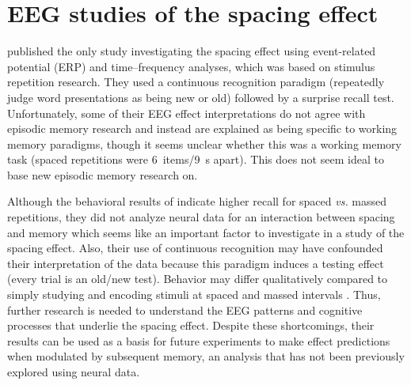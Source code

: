 
\section{EEG studies of the spacing effect}

 published the only study investigating the spacing effect using event-related potential (ERP) and time--frequency analyses, which was based on stimulus repetition research.  They used a continuous recognition paradigm (repeatedly judge word presentations as being new or old) followed by a surprise recall test.
Unfortunately, some of their EEG effect interpretations do not agree with episodic memory research and instead are explained as being specific to working memory paradigms, though it seems unclear whether this was a working memory task (spaced repetitions were 6~items/9~s apart).  This does not seem ideal to base new episodic memory research on.


Although the behavioral results of  indicate higher recall for spaced \textit{vs.} massed repetitions, they did not analyze neural data for an interaction between spacing and memory which seems like an important factor to investigate in a study of the spacing effect.  Also, their use of continuous recognition may have confounded their interpretation of the data because this paradigm induces a testing effect (every trial is an old/new test).  Behavior may differ qualitatively compared to simply studying and encoding stimuli at spaced and massed intervals \cite[p.~91]{DelaEtal2010}.
Thus, further research is needed to understand the EEG patterns and cognitive processes that underlie the spacing effect.  Despite these shortcomings, their results can be used as a basis for future experiments to make effect predictions when modulated by subsequent memory, an analysis that has not been previously explored using neural data.





